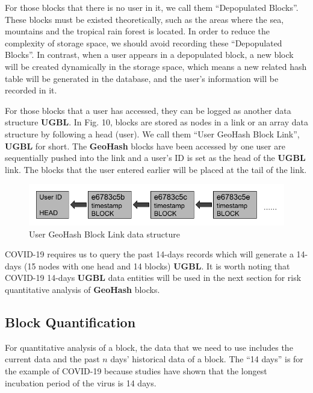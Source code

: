 \documentclass[conference]{IEEEtran}
\begin{document}
For those blocks that there is no user in it, we call them ``Depopulated Blocks''.
These blocks must be existed theoretically, such as the areas where the sea, mountains and the tropical rain forest is located.
In order to reduce the complexity of storage space, we should avoid recording these ``Depopulated Blocks''.
In contrast, when a user appears in a depopulated block, a new block will be created dynamically in the storage space, which means a new related hash table will be generated in the database, and the user's information will be recorded in it.

For those blocks that a user has accessed, they can be logged as another data structure \textbf{UGBL}.
In Fig. 10, blocks are stored as nodes in a link or an array data structure by following a head (user).
We call them ``User GeoHash Block Link'', \textbf{UGBL} for short.
The \textbf{GeoHash} blocks have been accessed by one user are sequentially pushed into the link and a user's ID is set as the head of the \textbf{UGBL} link.
The blocks that the user entered earlier will be placed at the tail of the link.
\begin{figure}[h]
    \centering\includegraphics[width=\linewidth]{UGBL.png}
    \caption{User GeoHash Block Link data structure}
\end{figure}

COVID-19 requires us to query the past 14-days records which will generate a 14-days (15 nodes with one head and 14 blocks) \textbf{UGBL}.
It is worth noting that COVID-19 14-days \textbf{UGBL} data entities will be used in the next section for risk quantitative analysis of \textbf{GeoHash} blocks.

\subsection{Block Quantification}
For quantitative analysis of a block, the data that we need to use includes the current data and the past $n$ days' historical data of a block.
The ``14 days'' is for the example of COVID-19 because studies have shown that the longest incubation period of the virus is 14 days\cite{lauer2020incubation}.
\end{document}
